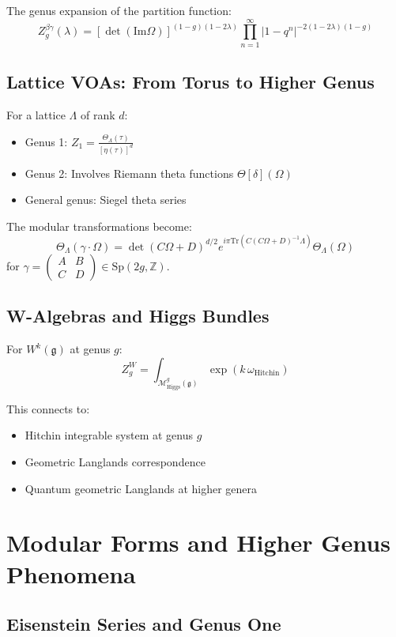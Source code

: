 The genus expansion of the partition function:
$$Z_g^{\beta\gamma}(\lambda) = \left[\det(\text{Im}\Omega)\right]^{(1-g)(1-2\lambda)} \prod_{n=1}^{\infty} |1-q^n|^{-2(1-2\lambda)(1-g)}$$

\section{Lattice VOAs: From Torus to Higher Genus}

For a lattice $\Lambda$ of rank $d$:

\begin{itemize}
\item Genus 1: $Z_1 = \frac{\Theta_\Lambda(\tau)}{[\eta(\tau)]^d}$
\item Genus 2: Involves Riemann theta functions $\Theta[\delta](\Omega)$
\item General genus: Siegel theta series
\end{itemize}

The modular transformations become:
$$\Theta_\Lambda(\gamma \cdot \Omega) = \det(C\Omega + D)^{d/2} e^{i\pi \text{Tr}(C(C\Omega+D)^{-1}\Lambda)} \Theta_\Lambda(\Omega)$$
for $\gamma = \begin{pmatrix} A & B \\ C & D \end{pmatrix} \in \text{Sp}(2g, \mathbb{Z})$.

\section{W-Algebras and Higgs Bundles}

For $W^k(\mathfrak{g})$ at genus $g$:
$$Z_g^W = \int_{\mathcal{M}_{\text{Higgs}}^g(\mathfrak{g})} \exp\left(k \, \omega_{\text{Hitchin}}\right)$$

This connects to:
\begin{itemize}
\item Hitchin integrable system at genus $g$
\item Geometric Langlands correspondence
\item Quantum geometric Langlands at higher genera
\end{itemize}

\chapter{Modular Forms and Higher Genus Phenomena}

\section{Eisenstein Series and Genus One}

